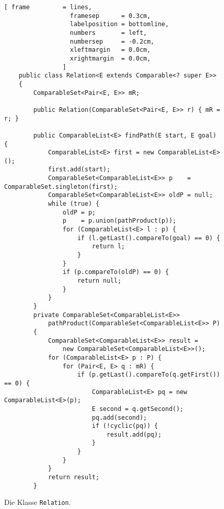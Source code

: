 \begin{figure}[!h]
\centering
\begin{Verbatim}[ frame         = lines, 
                  framesep      = 0.3cm, 
                  labelposition = bottomline,
                  numbers       = left,
                  numbersep     = -0.2cm,
                  xleftmargin   = 0.0cm,
                  xrightmargin  = 0.0cm,
                ]
    public class Relation<E extends Comparable<? super E>>
    {
        ComparableSet<Pair<E, E>> mR;
        
        public Relation(ComparableSet<Pair<E, E>> r) { mR = r; }
    
        public ComparableList<E> findPath(E start, E goal) {
            ComparableList<E> first = new ComparableList<E>();
            first.add(start);
            ComparableSet<ComparableList<E>> p    = ComparableSet.singleton(first);
            ComparableSet<ComparableList<E>> oldP = null;
            while (true) {
                oldP = p;
                p    = p.union(pathProduct(p));
                for (ComparableList<E> l : p) {
                    if (l.getLast().compareTo(goal) == 0) {
                        return l;
                    }
                }
                if (p.compareTo(oldP) == 0) {
                    return null;
                } 
            }
        }
        private ComparableSet<ComparableList<E>> 
            pathProduct(ComparableSet<ComparableList<E>> P) 
        {
            ComparableSet<ComparableList<E>> result = 
                new ComparableSet<ComparableList<E>>();
            for (ComparableList<E> p : P) {
                for (Pair<E, E> q : mR) {
                    if (p.getLast().compareTo(q.getFirst()) == 0) {
                        ComparableList<E> pq = new ComparableList<E>(p);
                        E second = q.getSecond();
                        pq.add(second);
                        if (!cyclic(pq)) {
                            result.add(pq);
                        }
                    }
                }
            }
            return result;
        }
\end{Verbatim}
\vspace*{-0.3cm}
\caption{Die Klasse \texttt{Relation}.}
\label{fig:Relation.java}
\end{figure}

